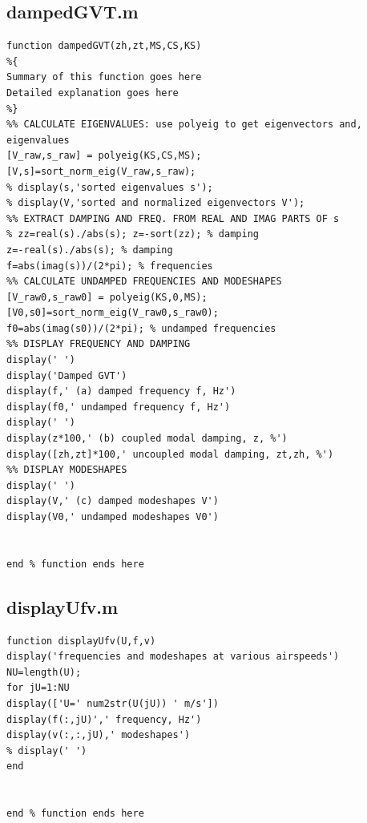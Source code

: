 \documentclass{article}
\begin{document}
\subsection{dampedGVT.m}
\begin{lstlisting}[caption={Helper script for Homework 1.}, label={lst:main_script}]
function dampedGVT(zh,zt,MS,CS,KS)
%{
Summary of this function goes here
Detailed explanation goes here
%}
%% CALCULATE EIGENVALUES: use polyeig to get eigenvectors and, eigenvalues
[V_raw,s_raw] = polyeig(KS,CS,MS);
[V,s]=sort_norm_eig(V_raw,s_raw);
% display(s,'sorted eigenvalues s');
% display(V,'sorted and normalized eigenvectors V');
%% EXTRACT DAMPING AND FREQ. FROM REAL AND IMAG PARTS OF s
% zz=real(s)./abs(s); z=-sort(zz); % damping
z=-real(s)./abs(s); % damping
f=abs(imag(s))/(2*pi); % frequencies
%% CALCULATE UNDAMPED FREQUENCIES AND MODESHAPES
[V_raw0,s_raw0] = polyeig(KS,0,MS);
[V0,s0]=sort_norm_eig(V_raw0,s_raw0);
f0=abs(imag(s0))/(2*pi); % undamped frequencies
%% DISPLAY FREQUENCY AND DAMPING
display(' ')
display('Damped GVT')
display(f,' (a) damped frequency f, Hz')
display(f0,' undamped frequency f, Hz')
display(' ')
display(z*100,' (b) coupled modal damping, z, %')
display([zh,zt]*100,' uncoupled modal damping, zt,zh, %')
%% DISPLAY MODESHAPES
display(' ')
display(V,' (c) damped modeshapes V')
display(V0,' undamped modeshapes V0')


end % function ends here
\end{lstlisting}

\newpage
\subsection{displayUfv.m}
\begin{lstlisting}[caption={Helper script for Homework 1.}, label={lst:main_script}]
function displayUfv(U,f,v)
display('frequencies and modeshapes at various airspeeds')
NU=length(U);
for jU=1:NU
display(['U=' num2str(U(jU)) ' m/s'])
display(f(:,jU)',' frequency, Hz')
display(v(:,:,jU),' modeshapes')
% display(' ')
end


end % function ends here
\end{lstlisting}

\newpage
\end{document}
